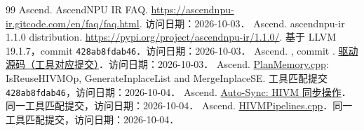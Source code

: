 \begin{thebibliography}{99}
 Ascend. AscendNPU IR FAQ. \url{https://ascendnpu-ir.gitcode.com/en/faq/faq.html}. 访问日期：2026-10-03．
 Ascend. ascendnpu-ir 1.1.0 distribution. \url{https://pypi.org/project/ascendnpu-ir/1.1.0/}. 基于 LLVM 19.1.7，commit \texttt{428ab8fdab46}．访问日期：2026-10-03．
 Ascend. , commit . \href{https://github.com/Ascend/AscendNPU-IR/blob/428ab8fdab46a879c7349caba4cde705bc8c9bb6/bishengir/lib/Tools/bishengir-compile/BiShengIRCompileMain.cpp}{驱动源码（工具对应提交）}．访问日期：2026-10-03．
 Ascend. \href{https://github.com/Ascend/AscendNPU-IR/blob/428ab8fdab46a879c7349caba4cde705bc8c9bb6/bishengir/lib/Dialect/HIVM/Transforms/PlanMemory.cpp}{PlanMemory.cpp}: IsReuseHIVMOp, GenerateInplaceList and MergeInplaceSE. 工具匹配提交 \texttt{428ab8fdab46}，访问日期：2026-10-04．
 Ascend. \href{https://github.com/Ascend/AscendNPU-IR/blob/428ab8fdab46a879c7349caba4cde705bc8c9bb6/docs/source/zh_cn/developer_guide/features/AutoSync/AutoSync.md}{Auto-Sync: HIVM 同步操作}．同一工具匹配提交，访问日期：2026-10-04．
 Ascend. \href{https://github.com/Ascend/AscendNPU-IR/blob/428ab8fdab46a879c7349caba4cde705bc8c9bb6/bishengir/lib/Dialect/HIVM/Pipelines/HIVMPipelines.cpp}{HIVMPipelines.cpp}．同一工具匹配提交，访问日期：2026-10-04．
\end{thebibliography}
\endgroup
